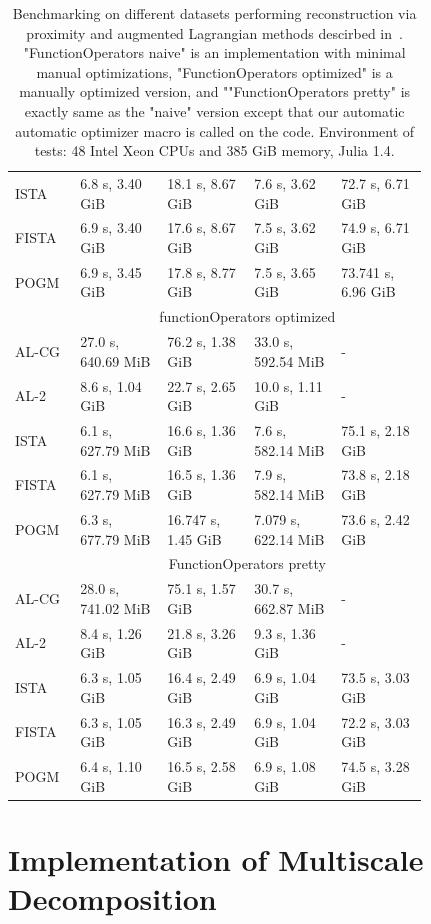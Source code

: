 \begin{table}
\begin{tabular}{|p{0.1\linewidth}|p{0.18\linewidth}p{0.18\linewidth}p{0.18\linewidth}p{0.18\linewidth}|}
ISTA & 6.8 s, 3.40 GiB & 18.1 s, 8.67 GiB & 7.6 s, 3.62 GiB & 72.7 s, 6.71 GiB \\
FISTA & 6.9 s, 3.40 GiB & 17.6 s, 8.67 GiB & 7.5 s, 3.62 GiB & 74.9 s, 6.71 GiB \\
POGM & 6.9 s, 3.45 GiB & 17.8 s, 8.77 GiB & 7.5 s, 3.65 GiB & 73.741 s, 6.96 GiB \\ \hline
\multicolumn{1}{|c|}{} & \multicolumn{4}{c|}{functionOperators optimized} \\
AL-CG & 27.0 s, 640.69 MiB & 76.2 s, 1.38 GiB & 33.0 s, 592.54 MiB & - \\
AL-2 & 8.6 s, 1.04 GiB & 22.7 s, 2.65 GiB & 10.0 s, 1.11 GiB & - \\
ISTA & 6.1 s, 627.79 MiB & 16.6 s, 1.36 GiB & 7.6 s, 582.14 MiB & 75.1 s, 2.18 GiB \\
FISTA & 6.1 s, 627.79 MiB & 16.5 s, 1.36 GiB & 7.9 s, 582.14 MiB & 73.8 s, 2.18 GiB \\
POGM & 6.3 s, 677.79 MiB & 16.747 s, 1.45 GiB & 7.079 s, 622.14 MiB & 73.6 s, 2.42 GiB \\ \hline
\multicolumn{1}{|c|}{} & \multicolumn{4}{c|}{FunctionOperators pretty} \\
AL-CG & 28.0 s, 741.02 MiB & 75.1 s, 1.57 GiB & 30.7 s, 662.87 MiB & - \\
AL-2 & 8.4 s, 1.26 GiB & 21.8 s, 3.26 GiB & 9.3 s, 1.36 GiB & - \\
ISTA & 6.3 s, 1.05 GiB & 16.4 s, 2.49 GiB & 6.9 s, 1.04 GiB & 73.5 s, 3.03 GiB \\
FISTA & 6.3 s, 1.05 GiB & 16.3 s, 2.49 GiB & 6.9 s, 1.04 GiB & 72.2 s, 3.03 GiB \\
POGM & 6.4 s, 1.10 GiB & 16.5 s, 2.58 GiB & 6.9 s, 1.08 GiB & 74.5 s, 3.28 GiB \\ \hline
\end{tabular}
\caption{Benchmarking on different datasets performing reconstruction via proximity and augmented Lagrangian methods descirbed in~\cite{lin_efficient_2019}. "FunctionOperators naive" is an implementation with minimal manual optimizations, "FunctionOperators optimized" is a manually optimized version, and ""FunctionOperators pretty" is exactly same as the "naive" version except that our automatic automatic optimizer macro is called on the code. Environment of tests: 48 Intel Xeon CPUs and 385 GiB memory, Julia 1.4.}
\label{tab:lin_fessler}
\end{table}

\section{Implementation of Multiscale Decomposition}

